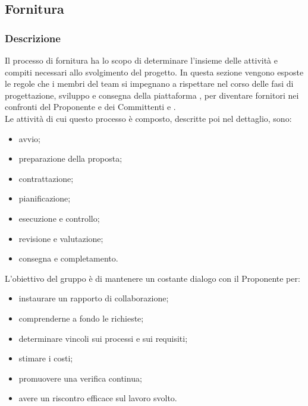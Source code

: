 \subsection{Fornitura}
    \subsubsection{Descrizione}
     Il processo di fornitura ha lo scopo di determinare l'insieme delle attività e compiti necessari allo svolgimento del progetto. 
     In questa sezione vengono esposte le regole che i membri del team \Gruppo{} si impegnano a rispettare nel corso delle fasi di progettazione, sviluppo e consegna della piattaforma \NomeProgetto{}, per diventare fornitori nei confronti del Proponente \Proponente{} e dei Committenti \TV{} e \RC{}. \\
     Le attività di cui questo processo è composto, descritte poi nel dettaglio, sono:
     \begin{itemize}
        	\item{avvio;}
        	\item{preparazione della proposta;}
        	\item{contrattazione;}
        	\item{pianificazione;}
        	\item{esecuzione e controllo;}
        	\item{revisione e valutazione;}
        	\item{consegna e completamento.}
     \end{itemize}
     L'obiettivo del gruppo è di mantenere un costante dialogo con il Proponente per:
     \begin{itemize}
	\item{instaurare un rapporto di collaborazione;} 
	\item{comprenderne a fondo le richieste;}
	\item{determinare vincoli sui processi e sui requisiti;}
	\item{stimare i costi;}
	\item{promuovere una verifica continua;}
	\item{avere un riscontro efficace sul lavoro svolto.}
     \end{itemize}
    
